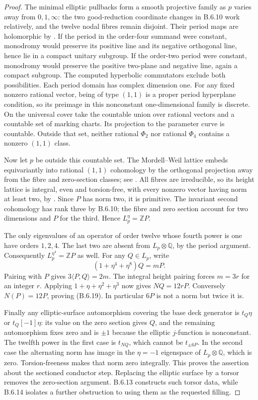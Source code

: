\begin{proof}
The minimal elliptic pullbacks form a smooth projective family
as $p$ varies away from $0,1,\infty$: the two good-reduction
coordinate changes in B.6.10 work relatively, and the twelve
nodal fibres remain disjoint. Their period maps are holomorphic
by \cite[Theorem (1.1)]{mapsGriffiths68II}.
If the period in the order-four summand were constant,
monodromy would preserve its positive line and its negative
orthogonal line, hence lie in a compact unitary subgroup.
If the order-two period were constant, monodromy would
preserve the positive two-plane and negative line, again a
compact subgroup. The computed hyperbolic commutators exclude
both possibilities. Each period domain has complex dimension
one. For any fixed nonzero rational vector, being of type
$(1,1)$ is a proper period hyperplane condition, so its
preimage in this nonconstant one-dimensional family is
discrete. On the universal cover take the countable union
over rational vectors and a countable set of marking charts.
Its projection to the parameter curve is countable.
Outside that set, neither rational $\Phi_2$ nor rational
$\Phi_4$ contains a nonzero $(1,1)$ class.

Now let $p$ be outside this countable set.
The Mordell--Weil lattice embeds equivariantly into rational
$(1,1)$ cohomology by the orthogonal projection away from the
fibre and zero-section classes; see
\cite[Lemmas 8.1--8.3 and Theorem 8.9]{mapsShioda90}.
All fibres are irreducible, so its height lattice is integral,
even and torsion-free, with every nonzero vector having norm
at least two, by \cite[Theorems 8.6--8.7]{mapsShioda90}.
Since $P$ has norm two, it is primitive. The invariant
second cohomology has rank three by B.6.10; the fibre and
zero section account for two dimensions and $P$ for the
third. Hence $L_p^\eta=\mathbb ZP$.

The only eigenvalues of an operator of order twelve whose
fourth power is one have orders $1,2,4$. The last two are
absent from $L_p\otimes\mathbb Q$, by the period argument.
Consequently $L_p^{\eta^4}=\mathbb ZP$ as well. For any
$Q\in L_p$, write
\[
 (1+\eta^4+\eta^8)Q=mP.
\]
Pairing with $P$ gives $3\langle P,Q\rangle=2m$.
The integral height pairing forces $m=3r$ for an integer
$r$. Applying $1+\eta+\eta^2+\eta^3$ now gives
$NQ=12rP$. Conversely $N(P)=12P$, proving (B.6.19).
In particular $6P$ is not a norm but twice it is.

Finally any elliptic-surface automorphism covering the base
deck generator is $t_Q\eta$ or $t_Q[-1]\eta$: its value on
the zero section gives $Q$, and the remaining automorphism
fixes zero and is $\pm1$ because the elliptic $j$-function
is nonconstant. The twelfth power in the first case is
$t_{NQ}$, which cannot be $t_{\pm6P}$. In the second case
the alternating norm has image in the $\eta=-1$ eigenspace
of $L_p\otimes\mathbb Q$, which is zero. Torsion-freeness
makes that norm zero integrally. This proves the assertion
about the sectioned conductor step. Replacing the elliptic
surface by a torsor removes the zero-section argument.
B.6.13 constructs such torsor data, while B.6.14 isolates
a further obstruction to using them as the requested filling.
\end{proof}

